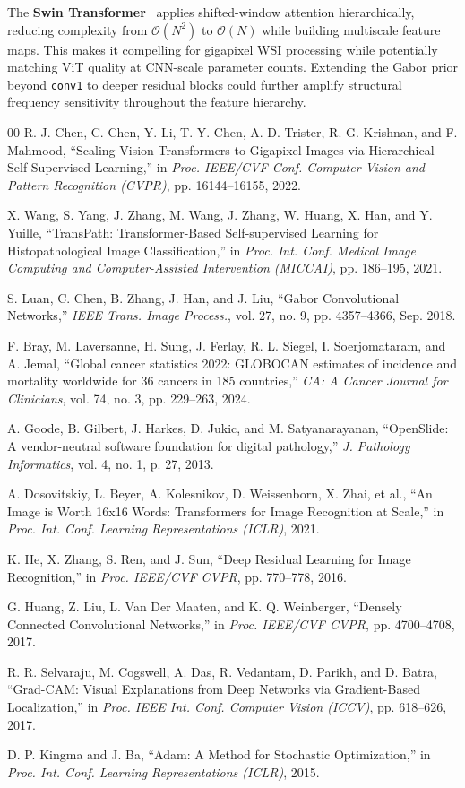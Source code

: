 \documentclass[conference]{IEEEtran}
\begin{document}
The \textbf{Swin Transformer}~\cite{b2} applies shifted-window attention hierarchically, reducing complexity from $\mathcal{O}(N^2)$ to $\mathcal{O}(N)$ while building multiscale feature maps. This makes it compelling for gigapixel WSI processing while potentially matching ViT quality at CNN-scale parameter counts. Extending the Gabor prior beyond \texttt{conv1} to deeper residual blocks could further amplify structural frequency sensitivity throughout the feature hierarchy.

\begin{thebibliography}{00}
 R. J. Chen, C. Chen, Y. Li, T. Y. Chen, A. D. Trister, R. G. Krishnan, and F. Mahmood, ``Scaling Vision Transformers to Gigapixel Images via Hierarchical Self-Supervised Learning,'' in \emph{Proc. IEEE/CVF Conf. Computer Vision and Pattern Recognition (CVPR)}, pp. 16144--16155, 2022.

 X. Wang, S. Yang, J. Zhang, M. Wang, J. Zhang, W. Huang, X. Han, and Y. Yuille, ``TransPath: Transformer-Based Self-supervised Learning for Histopathological Image Classification,'' in \emph{Proc. Int. Conf. Medical Image Computing and Computer-Assisted Intervention (MICCAI)}, pp. 186--195, 2021.

 S. Luan, C. Chen, B. Zhang, J. Han, and J. Liu, ``Gabor Convolutional Networks,'' \emph{IEEE Trans. Image Process.}, vol. 27, no. 9, pp. 4357--4366, Sep. 2018.

 F. Bray, M. Laversanne, H. Sung, J. Ferlay, R. L. Siegel, I. Soerjomataram, and A. Jemal, ``Global cancer statistics 2022: GLOBOCAN estimates of incidence and mortality worldwide for 36 cancers in 185 countries,'' \emph{CA: A Cancer Journal for Clinicians}, vol. 74, no. 3, pp. 229--263, 2024.

 A. Goode, B. Gilbert, J. Harkes, D. Jukic, and M. Satyanarayanan, ``OpenSlide: A vendor-neutral software foundation for digital pathology,'' \emph{J. Pathology Informatics}, vol. 4, no. 1, p. 27, 2013.

 A. Dosovitskiy, L. Beyer, A. Kolesnikov, D. Weissenborn, X. Zhai, et al., ``An Image is Worth 16x16 Words: Transformers for Image Recognition at Scale,'' in \emph{Proc. Int. Conf. Learning Representations (ICLR)}, 2021.

 K. He, X. Zhang, S. Ren, and J. Sun, ``Deep Residual Learning for Image Recognition,'' in \emph{Proc. IEEE/CVF CVPR}, pp. 770--778, 2016.

 G. Huang, Z. Liu, L. Van Der Maaten, and K. Q. Weinberger, ``Densely Connected Convolutional Networks,'' in \emph{Proc. IEEE/CVF CVPR}, pp. 4700--4708, 2017.

 R. R. Selvaraju, M. Cogswell, A. Das, R. Vedantam, D. Parikh, and D. Batra, ``Grad-CAM: Visual Explanations from Deep Networks via Gradient-Based Localization,'' in \emph{Proc. IEEE Int. Conf. Computer Vision (ICCV)}, pp. 618--626, 2017.

 D. P. Kingma and J. Ba, ``Adam: A Method for Stochastic Optimization,'' in \emph{Proc. Int. Conf. Learning Representations (ICLR)}, 2015.
\end{thebibliography}
\end{document}
